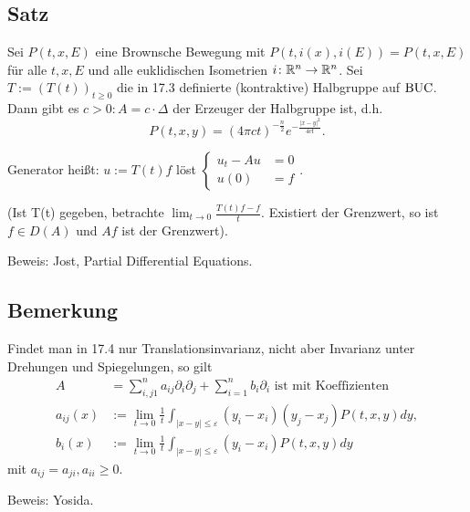 \subsection{Satz}

Sei $P(t,x,E)$ eine Brownsche Bewegung mit $P(t,i(x), i(E)) = P(t,x,E)$ für alle $t,x,E$ und alle euklidischen Isometrien $i \colon \mathbb{R}^n \to \mathbb{R}^n$.
Sei $T := (T(t))_{t \geq 0}$ die in 17.3 definierte (kontraktive) Halbgruppe auf $\operatorname{BUC}$.
Dann gibt es $c > 0 \colon A = c \cdot \Delta$ der Erzeuger der Halbgruppe ist, d.h.
$$
P(t,x,y) = (4 \pi c t)^{-\frac{n}{2}} e^{-\frac{|x - y|^2}{4ct}}.
$$

Generator heißt: $u := T(t)f$ löst $\begin{cases} u_t - Au &= 0 \\ u(0) &= f \end{cases}$.

(Ist T(t) gegeben, betrachte $\lim_{t \to 0} \frac{T(t)f - f}{t}$. 
Existiert der Grenzwert, so ist $f \in D(A)$ und $Af$ ist der Grenzwert).

Beweis: Jost, Partial Differential Equations.

\subsection{Bemerkung}

Findet man in 17.4 nur Translationsinvarianz, nicht aber Invarianz unter Drehungen und Spiegelungen, so gilt
\begin{align*}
  A &= \sum_{i,j  1}^n a_{ij} \partial_i \partial_j + \sum_{i = 1}^n b_i \partial_i \text{ ist mit Koeffizienten} \\
  a_{ij}(x) &:= \lim_{t \to 0} \frac{1}{t} \int_{|x - y| \leq \varepsilon} (y_i - x_i) (y_j - x_j) P(t,x,y) dy, \\
  b_i(x) &:= \lim_{t \to 0} \frac{1}{t} \int_{|x - y| \leq \varepsilon} (y_i - x_i) P(t,x,y) dy
\end{align*}
mit $a_{ij} = a_{ji}, a_{ii} \geq 0$.

Beweis: Yosida.

